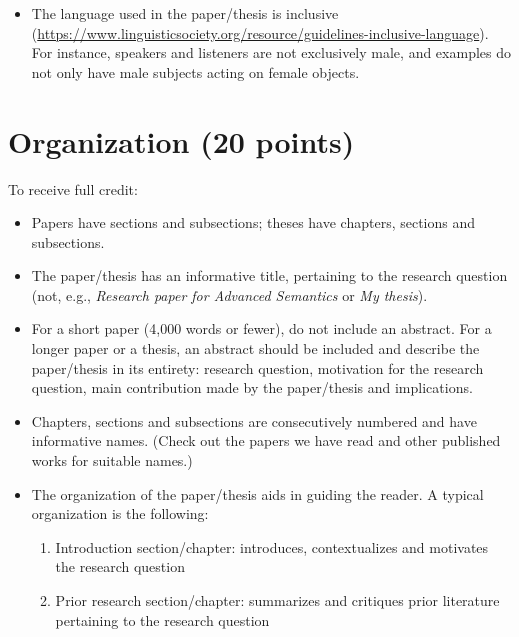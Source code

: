 \documentclass[11pt,fleqn,a4paper/thesis]{article}
\newcommand{\6}{\mbox{$[\hspace*{-.6mm}[$}}
\newcommand{\9}{\mbox{$]\hspace*{-.6mm}]$}}
\begin{document}
\begin{itemize}[itemsep=-1pt,leftmargin=2.5ex,topsep=-2pt]
\item The language used in the paper/thesis is inclusive (\url{https://www.linguisticsociety.org/resource/guidelines-inclusive-language}). For instance, speakers and listeners are not exclusively male, and examples do not only have male subjects acting on female objects.

\end{itemize}

\section{Organization (20 points)}

To receive full credit:

\begin{itemize}[itemsep=-1pt,leftmargin=2.5ex,topsep=-2pt]

\item Papers have sections and subsections; theses have chapters, sections and subsections.

\item The paper/thesis has an informative title, pertaining to the research question (not, e.g., {\em Research paper for Advanced Semantics} or {\em My thesis}).

\item For a short paper (4,000 words or fewer), do not include an abstract. For a longer paper or a thesis, an abstract should be included and describe the paper/thesis in its entirety: research question, motivation for the research question, main contribution made by the paper/thesis and implications.

\item Chapters, sections and subsections are consecutively numbered and have informative names. (Check out the papers we have read and other published works for suitable names.)

\item The organization of the paper/thesis aids in guiding the reader. A typical organization is the following:

\begin{enumerate}[itemsep=-1pt,leftmargin=3.5ex,topsep=-2pt]

\item Introduction section/chapter: introduces, contextualizes and motivates the research question

\item Prior research section/chapter: summarizes and critiques prior literature pertaining to the research question


\end{enumerate}
\end{itemize}
\end{document}
